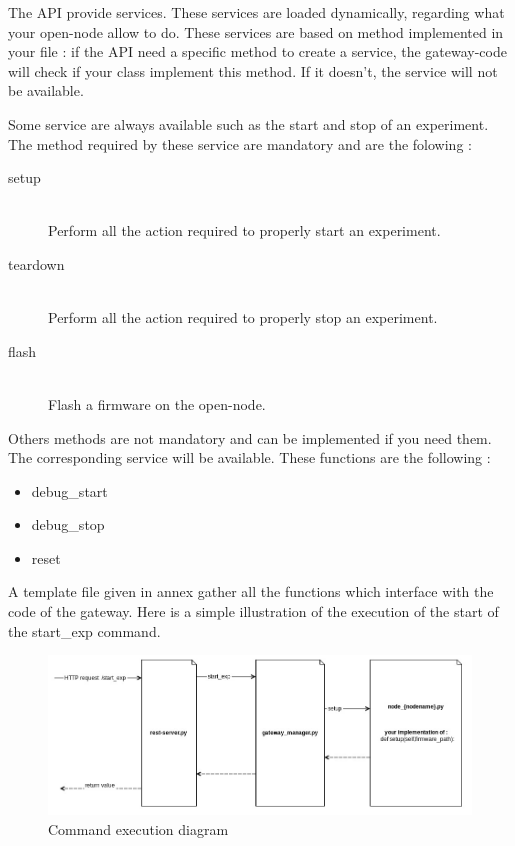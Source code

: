\documentclass[12pt,a4paper,twoside]{article}
\begin{document}
The API provide services. These services are loaded dynamically, regarding what your open-node allow to do. These services are based on method implemented in your file : if the API need a specific method to create a service, the gateway-code will check if your class implement this method. If it doesn't, the service will not be available.

Some service are always available such as the start and stop of an experiment.
The method required by these service are mandatory and are the folowing :\newline
\begin{description}
\item[setup] \hfill \\ Perform all the action required to properly start an experiment.
\item[teardown] \hfill \\ Perform all the action required to properly stop an experiment.
\item[flash] \hfill \\ Flash a firmware on the open-node.
\end{description}
Others methods are not mandatory and can be implemented if you need them. The corresponding service will be available.
These functions are the following :
\begin{itemize}
\item debug\_start
\item debug\_stop
\item reset
\end{itemize}
A template file given in annex gather all the functions which interface with the code of the gateway.\newline
Here is a simple illustration of the execution of the start of the start\_exp command.\newline
\begin{figure}[H]
\centering
\includegraphics[scale=0.5]{diag.jpg}
\caption{Command execution diagram}
\label{fig1}
\end{figure}
\end{document}
